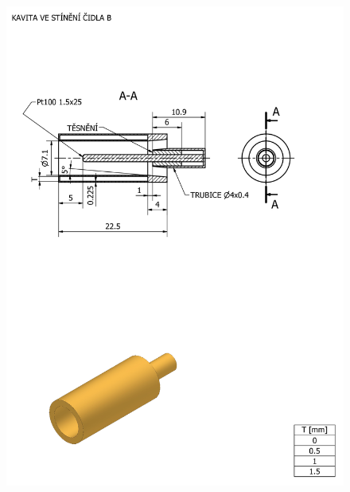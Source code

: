    \begin{figure}[ht!]
        \centering
        \includegraphics[width=\textwidth]{400_SIMULACE_KONSTRUKCNICH_UPRAV/Vykresy_rendery/Kavita_B_vykres.png}
    \end{figure}